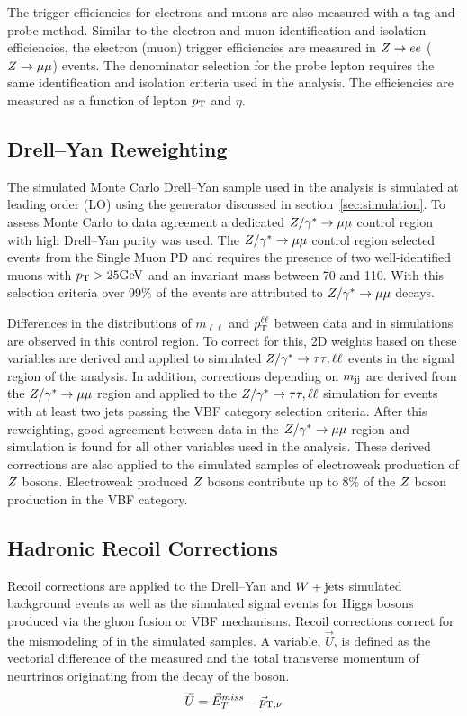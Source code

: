 The trigger efficiencies for electrons and muons are also measured with a tag-and-probe method.
Similar to the electron and muon identification and isolation efficiencies, the 
electron (muon) trigger efficiencies are measured in $Z\to ee$ ($Z\to\mu\mu$) events.
The denominator selection for the probe lepton requires the same identification and
isolation criteria used in the analysis. The efficiencies are measured as a function of
lepton $p_\mathrm{T}$ and $\eta$.



\subsection{Drell--Yan Reweighting}
\label{sec:htt_dy_reweighting}
The simulated Monte Carlo Drell--Yan sample used in the analysis is simulated at leading order (LO)
using the \MGAMCNLO generator discussed in section~\ref{sec:simulation}. To assess Monte Carlo to
data agreement a dedicated $Z/\gamma^*\to\mu\mu$ control region with high Drell--Yan purity was used.
The $Z/\gamma^*\to\mu\mu$ control region selected events from the Single Muon PD and requires the 
presence of two well-identified muons with $p_\mathrm{T} > 25 \mathrm{GeV}$ and an invariant mass between 70 and 110\GeV.
With this selection criteria over 99\% of the events are attributed to $Z/\gamma^*\to\mu\mu$ decays.

Differences in the distributions of $m_{\ell\ell}$ and $p_\mathrm{T}^{\ell\ell}$ between data and 
in simulations are observed in this control region. To correct for this, 2D weights based on these variables 
are derived and applied to simulated $Z/\gamma^*\to\tau\tau, \ell\ell$ events in the signal region of the analysis. 
In addition, corrections depending on $m_\mathrm{jj}$ are derived from the $Z/\gamma^*\to\mu\mu$ region and 
applied to the $Z/\gamma^*\to\tau\tau, \ell\ell$ simulation for events with at least two jets passing the 
VBF category selection criteria. After this reweighting, good agreement between data in the 
$Z/\gamma^*\to\mu\mu$ region and simulation is found for all other variables used in the analysis.
These derived corrections are also applied to the simulated samples of electroweak production of $Z$ 
bosons. Electroweak produced $Z$ bosons contribute up to 8\% of the $Z$ boson production in the VBF category.



\subsection{Hadronic Recoil Corrections}
Recoil corrections are applied to the Drell--Yan and $W+\text{jets}$ simulated background events 
as well as the simulated signal events for 
Higgs bosons produced via the gluon fusion or VBF mechanisms. Recoil corrections correct for the
mismodeling of \etvecmiss in the simulated samples. A variable, $\vec{U}$, is defined as the 
vectorial difference of the measured \etvecmiss and the total transverse momentum of neurtrinos
originating from the decay of the boson.
\begin{equation}
\vec{U} = \vec{E}^{miss}_T - \vec{p}_{\text{T},\nu}
\end{equation}

